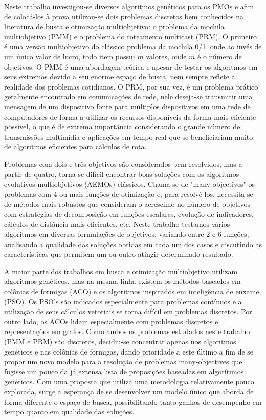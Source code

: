 Neste trabalho investigou-se diversos algoritmos genéticos para os PMOs e afim de colocá-los à prova utilizou-se dois problemas discretos bem conhecidos na literatura de busca e otimização multiobjetivo: o problema da mochila multiobjetivo (PMM) e o problema do roteamento multicast (PRM). O primeiro é uma versão multiobjetivo do clássico problema da mochila 0/1, onde ao invés de um único valor de lucro, todo item possui $m$ valores, onde $m$ é o número de objetivos. O PMM é uma abordagem teórica e apesar de testar os algoritmos em seus extremos devido a seu enorme espaço de busca, nem sempre reflete a realidade dos problemas cotidianos. O PRM, por sua vez, é um problema prático geralmente encontrado em comunicações de rede, nele deseja-se transmitir uma mensagem de um dispositivo fonte para múltiplos dispositivos em uma rede de computadores de forma a utilizar os recursos disponíveis da forma mais eficiente possível, o que é de extrema importância considerando o grande número de transmissões multimídia e aplicações em tempo real que se beneficiariam muito de algoritmos eficientes para cálculos de rota.

Problemas com dois e três objetivos são considerados bem resolvidos, mas a partir de quatro, torna-se difícil encontrar boas soluções com os algoritmos evolutivos multiobjetivos (AEMOs) clássicos. Chama-se de "many-objectives" os problemas com 4 ou mais funções de otimização e, para resolvê-los, necessita-se de métodos mais robustos que consideram o acréscimo no número de objetivos com estratégias de decomposição em funções escalares, evolução de indicadores, cálculos de distância mais eficientes, etc. Neste trabalho testamos vários algoritmos em diversas formulações de objetivos, variando entre 2 e 6 funções, analisando a qualidade das soluções obtidas em cada um dos casos e discutindo as características que permitem um ou outro atingir determinado resultado.

A maior parte dos trabalhos em busca e otimização multiobjetivo utilizam algoritmos genéticos, mas na mesma linha existem os métodos baseados em colônias de formigas (ACO) e os algoritmos inspirados em inteligência de enxame (PSO). Os PSO's são indicados especialmente para problemas contínuos e a utilização de seus cálculos vetoriais se torna difícil em problemas discretos. Por outro lado, os ACOs lidam especialmente com problemas discretos e representações em grafos. Como ambos os problemas estudados neste trabalho (PMM e PRM) são discretos, decidiu-se concentrar apenas nos algoritmos genéticos e nas colônias de formigas, dando prioridade a este último a fim de se propor um novo modelo para a resolução de problemas many-objectives que fugisse um pouco da já extensa lista de proposições baseadas em algorítimos genéticos. Com uma proposta que utiliza uma metodologia relativamente pouco explorada, surge a esperança de se desenvolver um modelo único que aborda de forma diferente o espaço de busca, possibilitando tanto ganhos de desempenho em tempo quanto em qualidade das soluções.

